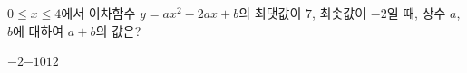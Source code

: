 $0\le x\le 4$에서 이차함수 $y=ax^2-2ax+b$의 최댓값이 $7$, 최솟값이 $-2$일 때, 상수 $a$, $b$에 대하여 $a+b$의 값은? 
\begin{choices32}{$-2$}{$-1$}{$0$}{$1$}{$2$}\end{choices32}
